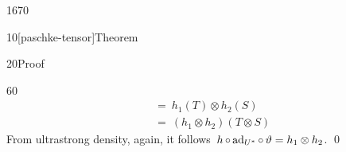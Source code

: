 \begin{parsec}{1670}
\begin{point}{10}[paschke-tensor]{Theorem}
\begin{point}{20}{Proof}
\begin{point}{60}
\begin{align*}
        & \ = \
        h_1(T) \otimes h_2(S) \\
        & \ = \
        (h_1\otimes h_2)(T \otimes S)
\end{align*}
From ultrastrong density, again, it
    follows~$h \mathop{\circ} \mathrm{ad}_{U^*} \mathop{\circ} \vartheta = h_1 \otimes h_2$. \qed
\end{point}
\end{point}
\end{point}
\end{parsec}

